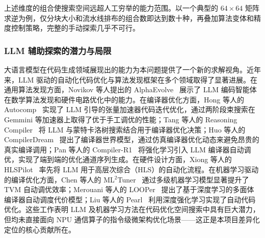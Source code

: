 \documentclass{CjC}
\begin{document}
    上述维度的组合使搜索空间远超人工穷举的能力范围。以一个典型的 $64 \times 64$
    矩阵求逆为例，仅分块大小和流水线排布的组合数即达到数十种，再叠加算法变体和精度控制策略，完整的手动探索几乎不可行。

    \subsubsection{LLM 辅助探索的潜力与局限}

    大语言模型在代码生成领域展现出的能力为本问题提供了一个新的求解视角。近年来，LLM
    驱动的自动化代码优化与算法发现框架在多个领域取得了显著进展。在通用算法发现方面，Novikov
    等人提出的 AlphaEvolve~\cite{novikov2025alphaevolve} 展示了 LLM
    编码智能体在数学算法发现和硬件电路优化中的能力。在编译器优化方面，Hong
    等人的 Autocomp~\cite{hong2025autocomp} 实现了 LLM
    引导的张量加速器代码迭代优化，通过两阶段束搜索在 Gemmini
    等加速器上取得了优于手工调优的性能；Tang 等人的 Reasoning Compiler~\cite{tang2025reasoningcompiler}
    将 LLM 与蒙特卡洛树搜索结合用于编译器优化决策；Huo 等人的 CompilerDream~\cite{huo2025compilerdream}
    提出了编译器世界模型，通过仿真编译器优化动态来避免昂贵的真实编译调用；Pan
    等人的 Compiler-R1~\cite{pan2025compilerr1} 将强化学习引入 LLM
    编译器自动调优，实现了端到端的优化通道序列生成。在硬件设计方面，Xiong 等人的
    HLSPilot~\cite{xiong2024hlspilot} 率先将 LLM
    用于高层次综合（HLS）的自动化流程。在机器学习驱动的编译优化方面，Chen 等人的
    ML$^{2}$Tuner~\cite{chen2024ml2tuner} 通过多级机器学习模型显著提升了 TVM
    自动调优效率；Merouani 等人的 LOOPer~\cite{merouani2024looper}
    提出了基于深度学习的多面体编译器自动调度代价模型；Liu 等人的 Pearl~\cite{liu2025pearl}
    利用深度强化学习实现了自动代码优化。这些工作表明 LLM
    及机器学习方法在代码优化空间搜索中具有巨大潜力，但均未直接面向 NPU
    通信算子的指令级微架构优化场景——这正是本项目差异化定位的核心贡献所在。
\end{document}
